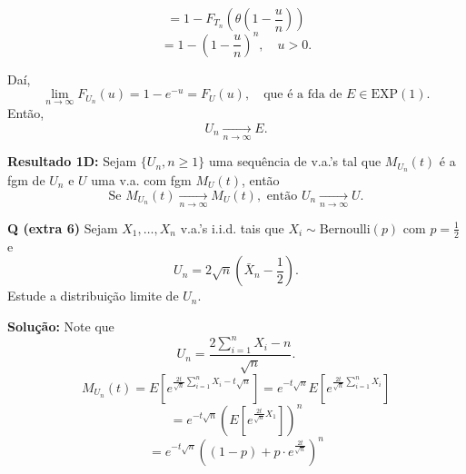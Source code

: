 \[
= 1 - F_{T_n}(\theta (1 - \frac{u}{n}))
\]
\[
= 1 - \left(1 - \frac{u}{n}\right)^n, \quad u > 0.
\]

Daí,
\[
\lim_{n \to \infty} F_{U_n}(u) = 1 - e^{-u} = F_U(u), \quad \text{que é a fda de } E \in \text{EXP}(1).
\]
Então,
\[
U_n \xrightarrow[n \to \infty]{} E.
\]

\textbf{Resultado 1D:} Sejam $\{U_n, n \geq 1\}$ uma sequência de v.a.'s tal que $M_{U_n}(t)$ é a fgm de $U_n$ e $U$ uma v.a. com fgm $M_U(t)$, então
\[
\text{Se } M_{U_n}(t) \xrightarrow[n \to \infty]{} M_U(t), \text{ então } U_n \xrightarrow[n \to \infty]{} U.
\]

\textbf{Q (extra 6)} Sejam $X_1, \ldots, X_n$ v.a.'s i.i.d. tais que $X_i \sim \text{Bernoulli}(p)$ com $p = \frac{1}{2}$ e 
\[
U_n = 2 \sqrt{n} \left( \bar{X}_n - \frac{1}{2} \right).
\]
Estude a distribuição limite de $U_n$.

\textbf{Solução:} Note que 
\[
U_n = \frac{2 \sum_{i=1}^n X_i - n}{\sqrt{n}}.
\]
\[
M_{U_n}(t) = E\left[ e^{\frac{2t}{\sqrt{n}} \sum_{i=1}^n X_i - t \sqrt{n}} \right] 
= e^{-t \sqrt{n}} E\left[ e^{\frac{2t}{\sqrt{n}} \sum_{i=1}^n X_i} \right]
\]
\[
= e^{-t \sqrt{n}} \left( E\left[ e^{\frac{2t}{\sqrt{n}} X_1} \right] \right)^n
\]
\[
= e^{-t \sqrt{n}} \left( (1-p) + p \cdot e^{\frac{2t}{\sqrt{n}}} \right)^n
\]